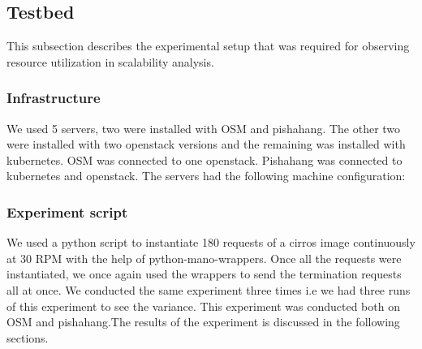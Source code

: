 \subsection{Testbed}

This subsection describes the experimental setup that was required for observing resource utilization in scalability analysis.
\subsubsection{Infrastructure}

We used 5 servers, two were installed with OSM and pishahang. The other two were installed with two openstack versions and the remaining was installed with kubernetes. OSM was connected to one openstack. Pishahang was connected to kubernetes and openstack. The servers had the following machine configuration:

\subsubsection{Experiment script}

We used a python script to instantiate 180 requests of a cirros image continuously at 30 RPM with the help of python-mano-wrappers. Once all the requests were instantiated, we once again used the wrappers to send the termination requests all at once. We conducted the same experiment three times i.e we had three runs of this experiment to see the variance. This experiment was conducted both on OSM and pishahang.The results of the experiment is discussed in the following sections.


